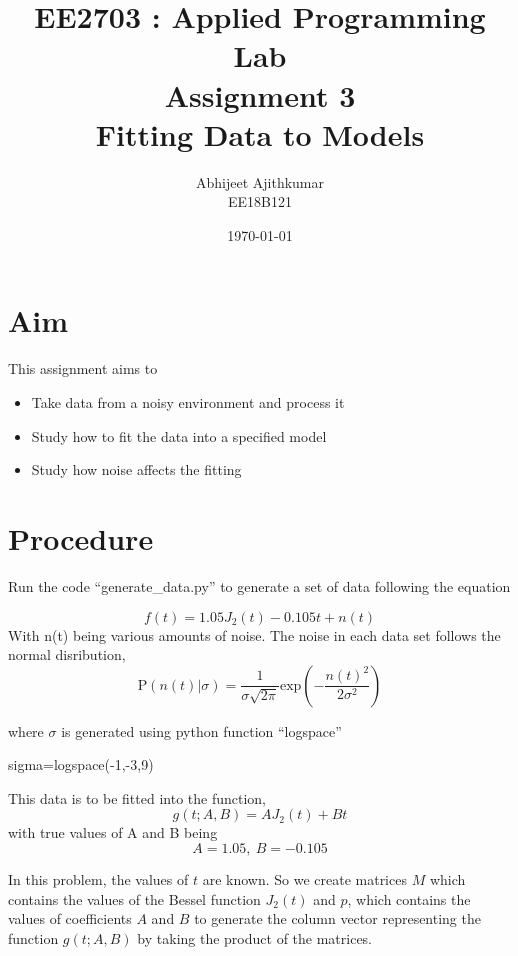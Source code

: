 \documentclass[12pt, a4paper]{report}
\title{\textbf{EE2703 : Applied Programming Lab \\ Assignment 3 \\ Fitting Data to Models}}
\author{Abhijeet Ajithkumar \\ EE18B121} %
\date{\today} %
\begin{document}
		
		
\maketitle %

\section*{Aim}
This assignment aims to
\begin{itemize}
  	\item Take data from a noisy environment and process it
  	\item Study how to fit the data into a specified model
	\item Study how noise affects the fitting
 \end{itemize}

\section*{Procedure}
Run the code ``generate\_data.py'' to generate a set of data following the equation
 
 \begin{equation}\label{eq:1}
f(t)=1.05J_{2}(t)-0.105t+n(t)
 \end{equation}
 With n(t) being various amounts of noise. The noise in each data set follows the normal disribution,
 \begin{equation*}
\mathrm{P}(n(t)|\sigma)=\frac{1}{\sigma\sqrt{2\pi}}\text{exp}\left(-\frac{n(t)^{2}}{2\sigma^{2}}\right)
 \end{equation*}
 
 where $\sigma$ is generated using python function ``logspace''

\begin{psudo}
sigma=logspace(-1,-3,9)
\end{psudo}

This data is to be fitted into the function,
\begin{equation}\label{eq:2}
g(t;A,B)=AJ_{2}(t)+Bt
\end{equation}
with true values of A and B being
\begin{equation*}
A=1.05,\ B=-0.105
\end{equation*}

In this problem, the values of $t$ are known. So we create matrices $M$ which contains the values of the Bessel function $J_{2}(t)$ and $p$, which contains the values of coefficients $A$ and $B$ to generate the column vector representing the function $g(t;A,B)$ by taking the product of the matrices.
\end{document}
